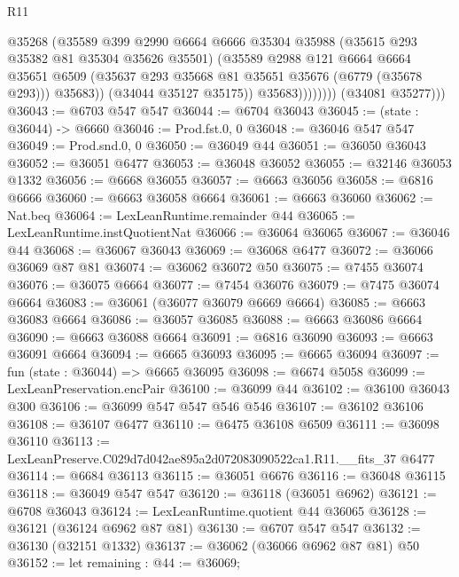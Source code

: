 \begin{lexlean}{R11}
\begin{coremodule}
                          @35268
                          (@35589
                            @399
                            @2990
                            @6664
                            @6666
                            @35304
                            @35988
                            (@35615 @293 @35382 @81 @35304 @35626 @35501)
                            (@35589
                              @2988
                              @121
                              @6664
                              @6664
                              @35651
                              @6509
                              (@35637 @293 @35668 @81 @35651 @35676 (@6779 (@35678 @293)))
                              @35683))
                          (@34044 @35127 @35175))
                        @35683))))))))
        (@34081 @35277)))
@36043 := @6703 @547 @547
@36044 := @6704 @36043
@36045 := (state : @36044) -> @6660
@36046 := Prod.fst.{0, 0}
@36048 := @36046 @547 @547
@36049 := Prod.snd.{0, 0}
@36050 := @36049 @44
@36051 := @36050 @36043
@36052 := @36051 @6477
@36053 := @36048 @36052
@36055 := @32146 @36053 @1332
@36056 := @6668 @36055
@36057 := @6663 @36056
@36058 := @6816 @6666
@36060 := @6663 @36058 @6664
@36061 := @6663 @36060
@36062 := Nat.beq
@36064 := LexLeanRuntime.remainder @44
@36065 := LexLeanRuntime.instQuotientNat
@36066 := @36064 @36065
@36067 := @36046 @44
@36068 := @36067 @36043
@36069 := @36068 @6477
@36072 := @36066 @36069 @87 @81
@36074 := @36062 @36072 @50
@36075 := @7455 @36074
@36076 := @36075 @6664
@36077 := @7454 @36076
@36079 := @7475 @36074 @6664
@36083 := @36061 (@36077 @36079 @6669 @6664)
@36085 := @6663 @36083 @6664
@36086 := @36057 @36085
@36088 := @6663 @36086 @6664
@36090 := @6663 @36088 @6664
@36091 := @6816 @36090
@36093 := @6663 @36091 @6664
@36094 := @6665 @36093
@36095 := @6665 @36094
@36097 := fun (state : @36044) => @6665 @36095
@36098 := @6674 @5058
@36099 := LexLeanPreservation.encPair
@36100 := @36099 @44
@36102 := @36100 @36043 @300
@36106 := @36099 @547 @547 @546 @546
@36107 := @36102 @36106
@36108 := @36107 @6477
@36110 := @6475 @36108 @6509
@36111 := @36098 @36110
@36113 := LexLeanPreserve.C029d7d042ae895a2d072083090522ca1.R11.__fits_37 @6477
@36114 := @6684 @36113
@36115 := @36051 @6676
@36116 := @36048 @36115
@36118 := @36049 @547 @547
@36120 := @36118 (@36051 @6962)
@36121 := @6708 @36043
@36124 := LexLeanRuntime.quotient @44 @36065
@36128 := @36121 (@36124 @6962 @87 @81)
@36130 := @6707 @547 @547
@36132 := @36130 (@32151 @1332)
@36137 := @36062 (@36066 @6962 @87 @81) @50
@36152 := let remaining : @44 := @36069;

\end{coremodule}
\end{lexlean}
